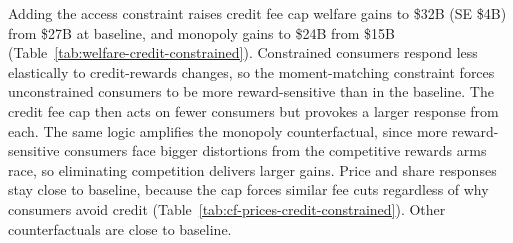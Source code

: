 \documentclass[main.tex]{subfiles}
\begin{document}
Adding the access constraint raises credit fee cap welfare gains to \$32B (SE \$4B) from \$27B at baseline, and monopoly gains to \$24B from \$15B (Table~\ref{tab:welfare-credit-constrained}).
Constrained consumers respond less elastically to credit-rewards changes, so the moment-matching constraint forces unconstrained consumers to be more reward-sensitive than in the baseline.
The credit fee cap then acts on fewer consumers but provokes a larger response from each.
The same logic amplifies the monopoly counterfactual, since more reward-sensitive consumers face bigger distortions from the competitive rewards arms race, so eliminating competition delivers larger gains.
Price and share responses stay close to baseline, because the cap forces similar fee cuts regardless of why consumers avoid credit (Table~\ref{tab:cf-prices-credit-constrained}).
Other counterfactuals are close to baseline.

\begin{table}[ht!]
    \caption{Counterfactual effects on prices and shares: Credit constraints}
    \label{tab:cf-prices-credit-constrained}
    \centering
    \small{
    
    }
\end{table}

\begin{table}[ht!]
    \caption{Counterfactual welfare effects: Credit constraints}
    \label{tab:welfare-credit-constrained}
    \centering
    \small{
    
    }
\end{table}
\end{document}
